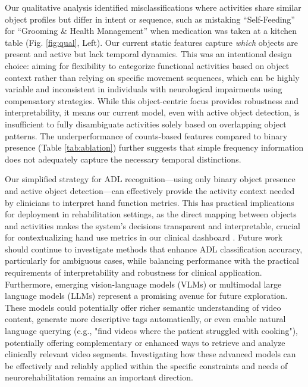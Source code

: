 \documentclass[journal,twoside,web]{ieeecolor}
\begin{document}
Our qualitative analysis identified misclassifications where activities share similar object profiles but differ in intent or sequence, such as mistaking “Self-Feeding” for “Grooming \& Health Management” when medication was taken at a kitchen table (Fig. \ref{fig:qual}, Left). Our current static features capture \textit{which} objects are present and active but lack temporal dynamics. This was an intentional design choice: aiming for flexibility to categorize functional activities based on object context rather than relying on specific movement sequences, which can be highly variable and inconsistent in individuals with neurological impairments using compensatory strategies. While this object-centric focus provides robustness and interpretability, it means our current model, even with active object detection, is insufficient to fully disambiguate activities solely based on overlapping object patterns. The underperformance of counts-based features compared to binary presence (Table \ref{tab:ablation}) further suggests that simple frequency information does not adequately capture the necessary temporal distinctions.

Our simplified strategy for ADL recognition---using only binary object presence and active object detection---can effectively provide the activity context needed by clinicians to interpret hand function metrics. This has practical implications for deployment in rehabilitation settings, as the direct mapping between objects and activities makes the system's decisions transparent and interpretable, crucial for contextualizing hand use metrics in our clinical dashboard \cite{Kadambi2023-iv}. Future work should continue to investigate methods that enhance ADL classification accuracy, particularly for ambiguous cases, while balancing performance with the practical requirements of interpretability and robustness for clinical application. Furthermore, emerging vision-language models (VLMs) or multimodal large language models (LLMs) represent a promising avenue for future exploration. These models could potentially offer richer semantic understanding of video content, generate more descriptive tags automatically, or even enable natural language querying (e.g., "find videos where the patient struggled with cooking"), potentially offering complementary or enhanced ways to retrieve and analyze clinically relevant video segments. Investigating how these advanced models can be effectively and reliably applied within the specific constraints and needs of neurorehabilitation remains an important direction.
\end{document}
